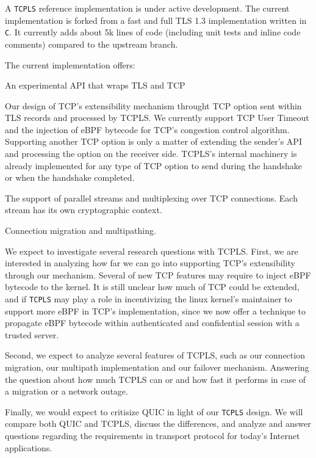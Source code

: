 
A \texttt{TCPLS} reference implementation is under active development. The
current implementation is forked from a fast and full
TLS 1.3 implementation written in \texttt{C}. It currently adds about 5k lines
of code (including unit tests and inline code comments) compared to the upstream branch.

The current implementation offers:
\begin{inparaenum}
  \item An experimental API that wraps TLS and TCP
  \item Our design of TCP's extensibility mechanism throught TCP option sent
within TLS records and processed by TCPLS. We currently support TCP User
Timeout and the injection of eBPF bytecode for TCP's congestion control
algorithm. Supporting another TCP option is only a matter of extending the sender's
API and processing the option
on the receiver side. TCPLS's internal machinery is already implemented for any
type of TCP option to send during the handshake or when the handshake completed.
  \item The support of parallel streams and multiplexing over TCP connections.
    Each stream has its own cryptographic context.
  \item Connection migration and multipathing.
\end{inparaenum}

We expect to investigate several research questions with TCPLS. First, we are
interested in analyzing how far we can go into supporting TCP's extensibility
through our mechanism. Several of new TCP features may require to inject eBPF
bytecode to the kernel. It is still unclear how much of TCP could be extended,
and if \texttt{TCPLS} may play a role in incentivizing the linux kernel's maintainer
to support more eBPF in TCP's implementation, since we now offer a technique to
propagate eBPF bytecode within authenticated and confidential session with a
trusted server.

Second, we expect to analyze several features of TCPLS, such as our
connection migration, our multipath implementation and our failover mechanism.
Answering the question about how much TCPLS can or and how fast it performs in
case of a migration or a network outage.

Finally, we would expect to critisize QUIC in light of our \texttt{TCPLS}
design. We will compare both QUIC and TCPLS, discuss the differences, and analyze
and answer questions regarding the requirements in transport protocol for today's
Internet applications.
